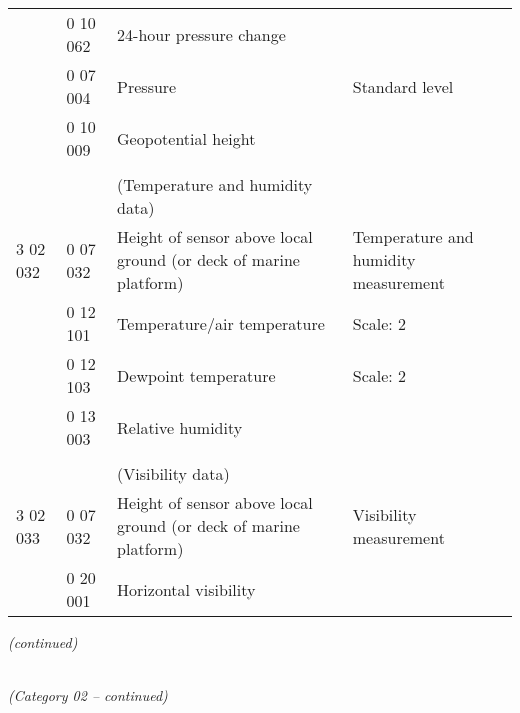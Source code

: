 \begin{longtable}[]{@{}llll@{}}
& 0 10 062 & 24-hour pressure change &\tabularnewline
& 0 07 004 & Pressure & Standard level\tabularnewline
& 0 10 009 & Geopotential height &\tabularnewline
& & &\tabularnewline
& & (Temperature and humidity data) &\tabularnewline
3 02 032 & 0 07 032 & Height of sensor above local ground (or deck of marine platform) & Temperature and humidity measurement\tabularnewline
& 0 12 101 & Temperature/air temperature & Scale: 2\tabularnewline
& 0 12 103 & Dewpoint temperature & Scale: 2\tabularnewline
& 0 13 003 & Relative humidity &\tabularnewline
& & &\tabularnewline
& & (Visibility data) &\tabularnewline
3 02 033 & 0 07 032 & Height of sensor above local ground (or deck of marine platform) & Visibility measurement\tabularnewline
& 0 20 001 & Horizontal visibility &\tabularnewline
\bottomrule
\end{longtable}

\emph{(continued)}

\emph{\\
(Category 02 -- continued)}

